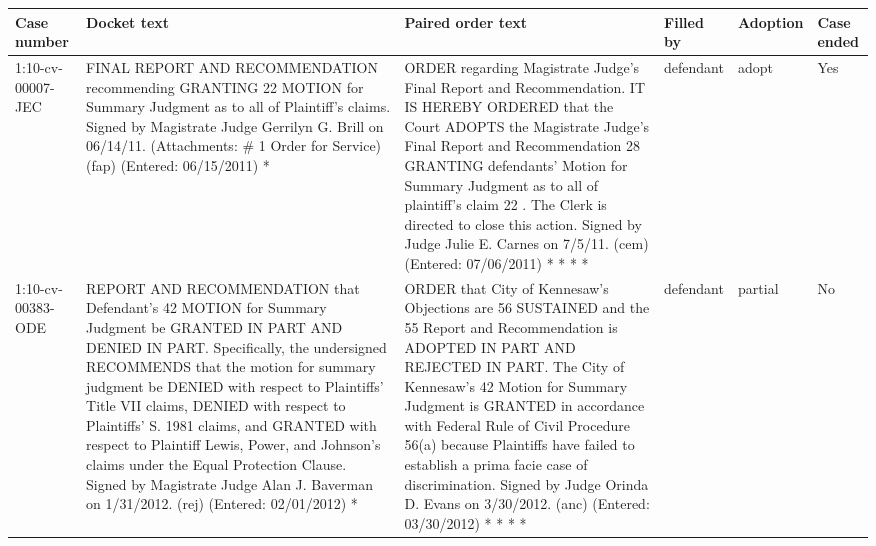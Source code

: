 
\begin{longtable}{ll>{\raggedright\arraybackslash}p{30em}lll}
\toprule
Case number & Docket text & Paired order text & Filled by & Adoption & Case ended\\
\midrule
1:10-cv-00007-JEC & FINAL REPORT AND RECOMMENDATION recommending GRANTING 22 MOTION for Summary Judgment as to all of Plaintiff's claims. Signed by Magistrate Judge Gerrilyn G. Brill on 06/14/11. (Attachments: \# 1 Order for Service)(fap) (Entered: 06/15/2011) * & ORDER regarding Magistrate Judge's Final Report and Recommendation. IT IS HEREBY ORDERED that the Court ADOPTS the Magistrate Judge's Final Report and Recommendation 28 GRANTING defendants' Motion for Summary Judgment as to all of plaintiff's claim 22 . The Clerk is directed to close this action. Signed by Judge Julie E. Carnes on 7/5/11. (cem) (Entered: 07/06/2011) * * * * & defendant & adopt & Yes\\
1:10-cv-00383-ODE & REPORT AND RECOMMENDATION that Defendant's 42 MOTION for Summary Judgment be GRANTED IN PART AND DENIED IN PART. Specifically, the undersigned RECOMMENDS that the motion for summary judgment be DENIED with respect to Plaintiffs' Title VII claims, DENIED with respect to Plaintiffs’ S. 1981 claims, and GRANTED with respect to Plaintiff Lewis, Power, and Johnson's claims under the Equal Protection Clause. Signed by Magistrate Judge Alan J. Baverman on 1/31/2012. (rej) (Entered: 02/01/2012) * & ORDER that City of Kennesaw's Objections are 56 SUSTAINED and the 55 Report and Recommendation is ADOPTED IN PART AND REJECTED IN PART. The City of Kennesaw's 42 Motion for Summary Judgment is GRANTED in accordance with Federal Rule of Civil Procedure 56(a) because Plaintiffs have failed to establish a prima facie case of discrimination. Signed by Judge Orinda D. Evans on 3/30/2012. (anc) (Entered: 03/30/2012) * * * * & defendant & partial & No\\
\bottomrule
\end{longtable}
